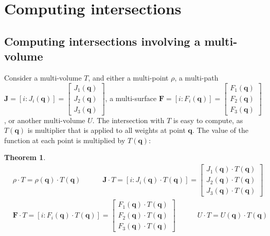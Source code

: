 \documentclass{book}
\newtheorem{thm}{Theorem}
\begin{document}
\section{Computing intersections}

\subsection*{Computing intersections involving a multi-volume}

Consider a multi-volume \(T\), and either a multi-point \(\rho\), a multi-path \(\mathbf{J} = [i : J_i(\mathbf{q})] = \begin{bmatrix} J_1(\mathbf{q}) \\ J_2(\mathbf{q}) \\ J_3(\mathbf{q}) \end{bmatrix}\), a multi-surface \(\mathbf{F} = [i : F_i(\mathbf{q})] = \begin{bmatrix} F_1(\mathbf{q}) \\ F_2(\mathbf{q}) \\ F_3(\mathbf{q}) \end{bmatrix}\), or another multi-volume \(U\). The intersection with \(T\) is easy to compute, as \(T(\mathbf{q})\) is multiplier that is applied to all weights at point \(\mathbf{q}\). The value of the function at each point is multiplied by \(T(\mathbf{q})\):

\begin{thm}
\begin{align*}
& \rho \cdot T = \rho(\mathbf{q}) \cdot T(\mathbf{q}) 
\quad\quad\quad \mathbf{J} \cdot T = [i : J_i(\mathbf{q}) \cdot T(\mathbf{q})] = \begin{bmatrix} J_1(\mathbf{q}) \cdot T(\mathbf{q}) \\ J_2(\mathbf{q}) \cdot T(\mathbf{q}) \\ J_3(\mathbf{q}) \cdot T(\mathbf{q}) \end{bmatrix} \\ 
& \mathbf{F} \cdot T = [i : F_i(\mathbf{q}) \cdot T(\mathbf{q})] = \begin{bmatrix} F_1(\mathbf{q}) \cdot T(\mathbf{q}) \\ F_2(\mathbf{q}) \cdot T(\mathbf{q}) \\ F_3(\mathbf{q}) \cdot T(\mathbf{q}) \end{bmatrix}  
\quad\quad\quad U \cdot T = U(\mathbf{q}) \cdot T(\mathbf{q})
\end{align*}
\end{thm}
\end{document}
